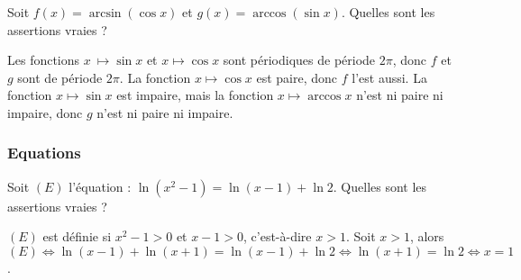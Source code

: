 \begin{question} 
Soit $f(x)=  \arcsin (\cos  x)$ et  $ g(x)= \arccos (\sin x) $. Quelles sont les assertions vraies ?
\begin{answers}



\end{answers}
\begin{explanations}
Les fonctions $x\ \mapsto   \sin x$ et $x  \mapsto  \cos  x$ sont périodiques de période $2\pi$, donc $f$ et $g$ sont de période $2\pi$. La fonction $x  \mapsto  \cos  x$  est paire, donc $f$ l'est aussi. La fonction $x  \mapsto  \sin   x$ est impaire, mais la fonction $x  \mapsto   \arccos  x$ n'est ni paire ni impaire, donc $g$ n'est ni paire ni impaire.
\end{explanations}

\end{question}



\subsubsection{Equations }



\begin{question} 
Soit $(E)$ l'équation : $\ln (x^2-1) = \ln (x-1) + \ln 2$. Quelles sont les assertions vraies ?
\begin{answers}
    \bad{$(E)$ est définie sur  $]-\infty, -1[ \cup  ]1,+\infty[$.}

    \good{$(E)$ est définie sur  $]1,+\infty[$.}


\end{answers}
\begin{explanations}
$(E)$ est définie si $x^2-1>0$ et $x-1>0$, c'est-à-dire $x>1$. 
Soit $x>1$, alors $(E) \Leftrightarrow  \ln (x-1) + \ln (x+1)= \ln (x-1) + \ln 2  \Leftrightarrow  \ln (x+1)=  \ln 2 \Leftrightarrow  x=1$.
\end{explanations}

\end{question}


